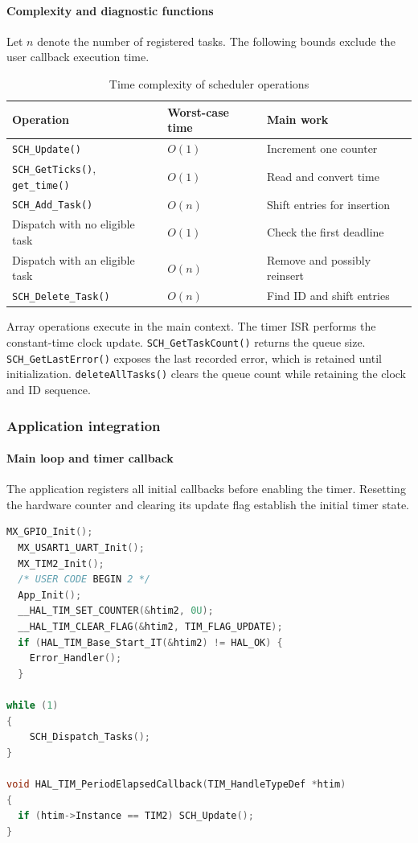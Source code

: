 \paragraph{Complexity and diagnostic functions}
Let $n$ denote the number of registered tasks. The following bounds exclude the user callback execution time.
\begin{table}[!htp]
    \centering
    \begin{tabular}{lll}
        \toprule
        Operation & Worst-case time & Main work \\
        \midrule
        \texttt{SCH\_Update()} & $O(1)$ & Increment one counter \\
        \texttt{SCH\_GetTicks()}, \texttt{get\_time()} & $O(1)$ & Read and convert time \\
        \texttt{SCH\_Add\_Task()} & $O(n)$ & Shift entries for insertion \\
        Dispatch with no eligible task & $O(1)$ & Check the first deadline \\
        Dispatch with an eligible task & $O(n)$ & Remove and possibly reinsert \\
        \texttt{SCH\_Delete\_Task()} & $O(n)$ & Find ID and shift entries \\
        \bottomrule
    \end{tabular}
    \caption{Time complexity of scheduler operations}
    \label{lab4_complexity}
\end{table}

Array operations execute in the main context. The timer ISR performs the constant-time clock update. \texttt{SCH\_GetTaskCount()} returns the queue size. \texttt{SCH\_GetLastError()} exposes the last recorded error, which is retained until initialization. \texttt{deleteAllTasks()} clears the queue count while retaining the clock and ID sequence.

\subsubsection{Application integration}
\paragraph{Main loop and timer callback}
The application registers all initial callbacks before enabling the timer. Resetting the hardware counter and clearing its update flag establish the initial timer state.

\begin{lstlisting}[caption={Startup sequence and timer callback in main.c},language=C]
MX_GPIO_Init();
  MX_USART1_UART_Init();
  MX_TIM2_Init();
  /* USER CODE BEGIN 2 */
  App_Init();
  __HAL_TIM_SET_COUNTER(&htim2, 0U);
  __HAL_TIM_CLEAR_FLAG(&htim2, TIM_FLAG_UPDATE);
  if (HAL_TIM_Base_Start_IT(&htim2) != HAL_OK) {
    Error_Handler();
  }

while (1)
{
    SCH_Dispatch_Tasks();
}

void HAL_TIM_PeriodElapsedCallback(TIM_HandleTypeDef *htim)
{
  if (htim->Instance == TIM2) SCH_Update();
}
\end{lstlisting}


